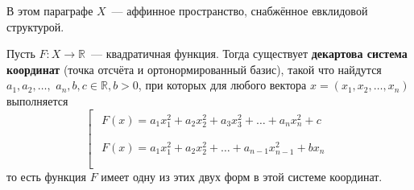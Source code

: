 \documentclass[11pt]{article}
\begin{document}
    В этом параграфе $X$~--- аффинное пространство, снабжённое евклидовой структурой.

    \begin{theorem}
    Пусть $F: X \to \mathbb{R}$~--- квадратичная функция. Тогда существует \textbf{декартова система координат} (точка отсчёта и ортонормированный базис), такой что найдутся $a_1, a_2, \hdots,$  $a_n, b, c \in \mathbb{R}, b > 0$, при которых для любого вектора $x = (x_1, x_2, \hdots, x_n)$ выполняется
    \begin{equation*}
        \left[
      \begin{gathered}
          \begin{gathered}
            F(x) = a_1x_1^2 + a_2x_2^2 + a_3x_3^2 + \hdots + a_nx_n^2 + c
            \\
          \end{gathered}
        \\
          \begin{gathered}
            F(x) = a_1x_1^2 + a_2x_2^2 + \hdots + a_{n-1}x_{n-1}^2 + bx_n
            \\
          \end{gathered}
        \\
      \end{gathered}
    \right.
    \end{equation*}
    то есть функция $F$ имеет одну из этих двух форм в этой системе координат.\end{theorem}
\end{document}
